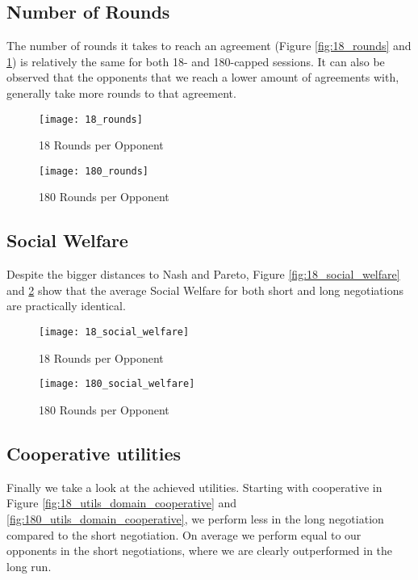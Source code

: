 \subsection{Number of Rounds}

The number of rounds it takes to reach an agreement (Figure \ref{fig:18_rounds} and \ref{fig:180_rounds}) is relatively the same for both 18- and 180-capped sessions. It can also be observed that the opponents that we reach a lower amount of agreements with, generally take more rounds to that agreement.\\

\begin{figure}[!htb]
	\texttt{[image: 18\_rounds]}
	\caption{18 Rounds per Opponent}
	\label{fig:18_rounds}
	\endminipage\hfill
	\texttt{[image: 180\_rounds]}
	\caption{180 Rounds per Opponent}
	\label{fig:180_rounds}
	\endminipage\hfill
\end{figure}

\subsection{Social Welfare}

Despite the bigger distances to Nash and Pareto, Figure \ref{fig:18_social_welfare} and \ref{fig:180_social_welfare} show that the average Social Welfare for both short and long negotiations are practically identical. \\

\begin{figure}[!htb]
	\texttt{[image: 18\_social\_welfare]}
	\caption{18 Rounds per Opponent}
	\label{fig:18_social_welfare}
	\endminipage\hfill
	\texttt{[image: 180\_social\_welfare]}
	\caption{180 Rounds per Opponent}
	\label{fig:180_social_welfare}
	\endminipage\hfill
\end{figure}

\subsection{Cooperative utilities}

Finally we take a look at the achieved utilities. Starting with cooperative in Figure \ref{fig:18_utils_domain_cooperative} and \ref{fig:180_utils_domain_cooperative}, we perform less in the long negotiation compared to the short negotiation. On average we perform equal to our opponents in the short negotiations, where we are clearly outperformed in the long run.\\

